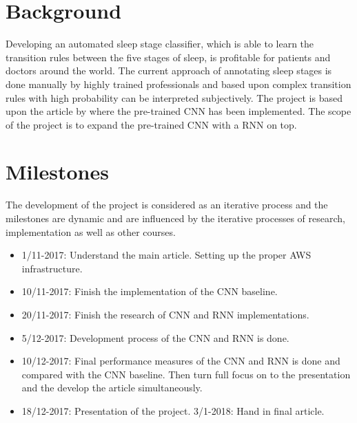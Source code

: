 \documentclass[11pt]{article}
\begin{document}
\section*{Background}
Developing an automated sleep stage classifier, which is able to learn the transition rules between the five stages of sleep, is profitable for patients and doctors around the world. 
The current approach of annotating sleep stages is done manually by highly trained professionals and based upon complex transition rules with high probability can be interpreted subjectively.
The project is based upon the article  by \citeauthor{main_ar} where the pre-trained CNN has been implemented. The scope of the project is to expand the pre-trained CNN with a RNN on top. 





%
%
%



%
%
%
%
%
%
%
%
%
%
%


\section*{Milestones}
The development of the project is considered as an iterative process and the milestones are dynamic and are influenced by the iterative processes of research, implementation as well as other courses.

\begin{multicols}{2}
\begin{itemize}
\item 1/11-2017: Understand the main article. Setting up the proper AWS infrastructure.
\item 10/11-2017: Finish the implementation of the CNN baseline.
\item 20/11-2017:  Finish the research of CNN and RNN implementations.
\item 5/12-2017: Development process of the CNN and RNN is done.
\item 10/12-2017: Final performance measures of the CNN and RNN is done and compared with the CNN baseline. Then turn full focus on to the presentation and the develop the article simultaneously.
\item 18/12-2017: Presentation of the project. 3/1-2018: Hand in final article.
\end{itemize}
\end{multicols}
\end{document}
